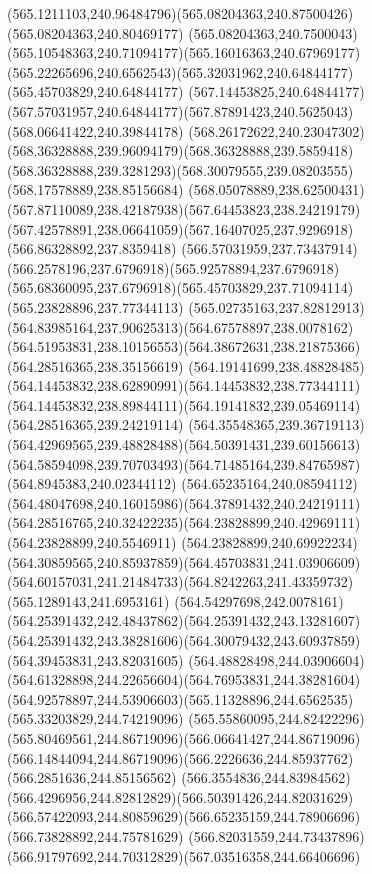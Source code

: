 {{	\curveto(565.1211103,240.96484796)(565.08204363,240.87500426)(565.08204363,240.80469177)
	\curveto(565.08204363,240.7500043)(565.10548363,240.71094177)(565.16016363,240.67969177)
	\curveto(565.22265696,240.6562543)(565.32031962,240.64844177)(565.45703829,240.64844177)
	\lineto(567.14453825,240.64844177)
	\curveto(567.57031957,240.64844177)(567.87891423,240.5625043)(568.06641422,240.39844178)
	\curveto(568.26172622,240.23047302)(568.36328888,239.96094179)(568.36328888,239.5859418)
	\curveto(568.36328888,239.3281293)(568.30079555,239.08203555)(568.17578889,238.85156684)
	\curveto(568.05078889,238.62500431)(567.87110089,238.42187938)(567.64453823,238.24219179)
	\curveto(567.42578891,238.06641059)(567.16407025,237.9296918)(566.86328892,237.8359418)
	\curveto(566.57031959,237.73437914)(566.2578196,237.6796918)(565.92578894,237.6796918)
	\curveto(565.68360095,237.6796918)(565.45703829,237.71094114)(565.23828896,237.77344113)
	\curveto(565.02735163,237.82812913)(564.83985164,237.90625313)(564.67578897,238.0078162)
	\curveto(564.51953831,238.10156553)(564.38672631,238.21875366)(564.28516365,238.35156619)
	\curveto(564.19141699,238.48828485)(564.14453832,238.62890991)(564.14453832,238.77344111)
	\curveto(564.14453832,238.89844111)(564.19141832,239.05469114)(564.28516365,239.24219114)
	\curveto(564.35548365,239.36719113)(564.42969565,239.48828488)(564.50391431,239.60156613)
	\curveto(564.58594098,239.70703493)(564.71485164,239.84765987)(564.8945383,240.02344112)
	\curveto(564.65235164,240.08594112)(564.48047698,240.16015986)(564.37891432,240.24219111)
	\curveto(564.28516765,240.32422235)(564.23828899,240.42969111)(564.23828899,240.5546911)
	\curveto(564.23828899,240.69922234)(564.30859565,240.85937859)(564.45703831,241.03906609)
	\curveto(564.60157031,241.21484733)(564.8242263,241.43359732)(565.1289143,241.6953161)
	\curveto(564.54297698,242.0078161)(564.25391432,242.48437862)(564.25391432,243.13281607)
	\curveto(564.25391432,243.38281606)(564.30079432,243.60937859)(564.39453831,243.82031605)
	\curveto(564.48828498,244.03906604)(564.61328898,244.22656604)(564.76953831,244.38281604)
	\curveto(564.92578897,244.53906603)(565.11328896,244.6562535)(565.33203829,244.74219096)
	\curveto(565.55860095,244.82422296)(565.80469561,244.86719096)(566.06641427,244.86719096)
	\curveto(566.14844094,244.86719096)(566.2226636,244.85937762)(566.2851636,244.85156562)
	\curveto(566.3554836,244.83984562)(566.4296956,244.82812829)(566.50391426,244.82031629)
	\curveto(566.57422093,244.80859629)(566.65235159,244.78906696)(566.73828892,244.75781629)
	\curveto(566.82031559,244.73437896)(566.91797692,244.70312829)(567.03516358,244.66406696)
}}
